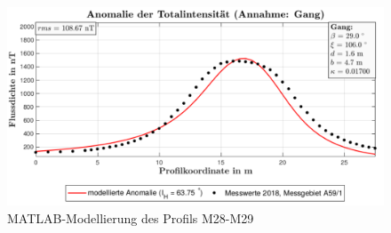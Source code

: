\begin{figure}
 \centering
 \includegraphics[width=\textwidth]{fig/modM28}
 \caption{MATLAB-Modellierung des Profils M28-M29}
 \label{fig:modM28}
\end{figure}

